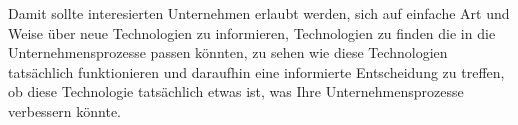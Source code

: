 Damit sollte interesierten Unternehmen erlaubt werden, sich auf einfache Art und Weise über neue Technologien zu informieren, Technologien zu finden die in die Unternehmensprozesse passen könnten, zu sehen wie diese Technologien tatsächlich funktionieren und daraufhin eine informierte Entscheidung zu treffen, ob diese Technologie tatsächlich etwas ist, was Ihre Unternehmensprozesse verbessern könnte.